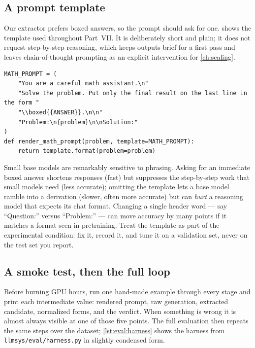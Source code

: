 \subsection{A prompt template}
Our extractor prefers boxed answers, so the prompt should ask for one.
 shows the template used throughout Part~VII. It is deliberately short and
plain; it does not request step-by-step reasoning, which keeps outputs brief for a first pass
and leaves chain-of-thought prompting as an explicit intervention for \cref{ch:scaling}.

\begin{lstlisting}[caption={The math prompt template.},label={lst:eval:prompt}]
MATH_PROMPT = (
    "You are a careful math assistant.\n"
    "Solve the problem. Put only the final result on the last line in the form "
    "\\boxed{{ANSWER}}.\n\n"
    "Problem:\n{problem}\n\nSolution:"
)
def render_math_prompt(problem, template=MATH_PROMPT):
    return template.format(problem=problem)
\end{lstlisting}

\begin{keyidea}
Small base models are remarkably sensitive to phrasing. Asking for an immediate boxed answer
shortens responses (fast) but suppresses the step-by-step work that small models need (less
accurate); omitting the template lets a base model ramble into a derivation (slower, often more
accurate) but can \emph{hurt} a reasoning model that expects its chat format. Changing a single
header word --- say ``Question:'' versus ``Problem:'' --- can move accuracy by many points if it
matches a format seen in pretraining. Treat the template as part of the experimental condition:
fix it, record it, and tune it on a validation set, never on the test set you report.
\end{keyidea}

\subsection{A smoke test, then the full loop}
Before burning GPU hours, run one hand-made example through every stage and print each
intermediate value: rendered prompt, raw generation, extracted candidate, normalized forms, and
the verdict. When something is wrong it is almost always visible at one of those five points.
The full evaluation then repeats the same steps over the dataset; \cref{lst:eval:harness} shows the
harness from \texttt{llmsys/eval/harness.py} in slightly condensed form.

